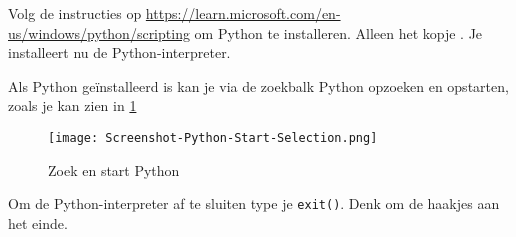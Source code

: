 Volg de instructies op \url{https://learn.microsoft.com/en-us/windows/python/scripting} om Python te installeren. Alleen het kopje . Je installeert nu de Python-interpreter.

Als Python ge\"installeerd is kan je via de zoekbalk Python opzoeken en opstarten, zoals je kan zien in \ref{fig:pythonint}

\begin{figure}[H]
\texttt{[image: Screenshot-Python-Start-Selection.png]}
        \caption{Zoek en start Python}
        \label{fig:pythonint}
\end{figure}

Om de Python-interpreter af te sluiten type je \texttt{exit()}. Denk om de haakjes aan het einde.

